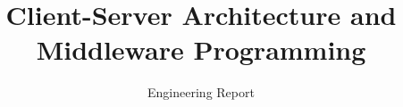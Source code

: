 \documentclass[12pt,a4paper]{report}
\begin{document}

\title{Client-Server Architecture and Middleware Programming}
\author{Engineering Report}



\tableofcontents
\listoffigures
\listoftables

\clearpage
{}


\end{document}
